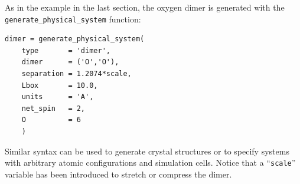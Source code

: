 %
%
%
%


As in the example in the last section, the oxygen dimer is generated with the \texttt{generate\_physical\_system} function:
\begin{lstlisting}
dimer = generate_physical_system(
    type       = 'dimer',
    dimer      = ('O','O'),
    separation = 1.2074*scale,
    Lbox       = 10.0,
    units      = 'A',
    net_spin   = 2,
    O          = 6
    )
\end{lstlisting}
\noindent
Similar syntax can be used to generate crystal structures or to specify systems with arbitrary atomic configurations and simulation cells.  Notice that a ``\texttt{scale}'' variable has been introduced to stretch or compress the dimer.  

